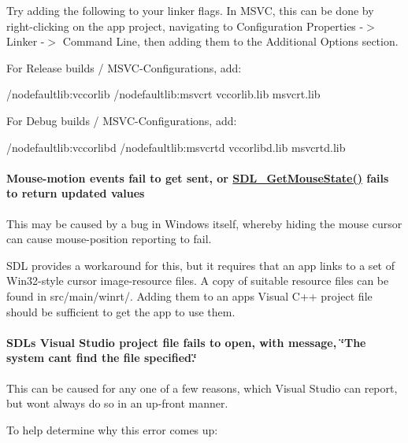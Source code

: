 Try adding the following to your linker flags. In M\+S\+VC, this can be done by right-\/clicking on the app project, navigating to Configuration Properties -\/$>$ Linker -\/$>$ Command Line, then adding them to the Additional Options section.


\begin{DoxyItemize}
\item For Release builds / M\+S\+V\+C-\/\+Configurations, add\+:

/nodefaultlib\+:vccorlib /nodefaultlib\+:msvcrt vccorlib.\+lib msvcrt.\+lib
\item For Debug builds / M\+S\+V\+C-\/\+Configurations, add\+:

/nodefaultlib\+:vccorlibd /nodefaultlib\+:msvcrtd vccorlibd.\+lib msvcrtd.\+lib
\end{DoxyItemize}

\paragraph*{Mouse-\/motion events fail to get sent, or \mbox{\hyperlink{_s_d_l__mouse_8h_a1561f413546c0e4f5f44a8f094926575}{S\+D\+L\+\_\+\+Get\+Mouse\+State()}} fails to return updated values}

This may be caused by a bug in Windows itself, whereby hiding the mouse cursor can cause mouse-\/position reporting to fail.

S\+DL provides a workaround for this, but it requires that an app links to a set of Win32-\/style cursor image-\/resource files. A copy of suitable resource files can be found in {\ttfamily src/main/winrt/}. Adding them to an app\textquotesingle{}s Visual C++ project file should be sufficient to get the app to use them.

\paragraph*{S\+DL\textquotesingle{}s Visual Studio project file fails to open, with message, \char`\"{}\+The system can\textquotesingle{}t find the file specified.\char`\"{}}

This can be caused for any one of a few reasons, which Visual Studio can report, but won\textquotesingle{}t always do so in an up-\/front manner.

To help determine why this error comes up\+:


